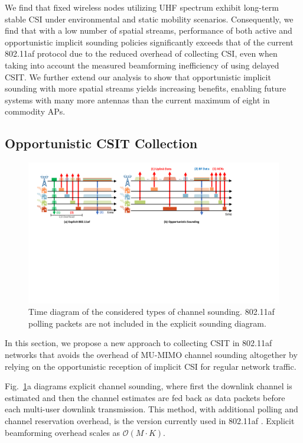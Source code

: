 We find that fixed wireless nodes utilizing UHF spectrum exhibit long-term stable \ac{CSI} under environmental and static mobility scenarios.
Consequently, we find that with a low number of spatial streams, performance of both active and opportunistic implicit sounding policies significantly exceeds that of the current 802.11af protocol due to the reduced overhead of collecting \ac{CSI}, even when taking into account the measured beamforming inefficiency of using delayed \ac{CSIT}.
We further extend our analysis to show that opportunistic implicit sounding with more spatial streams yields increasing benefits, enabling future systems with many more antennas than the current maximum of eight in commodity \acp{AP}.
	
\subsection{Opportunistic \ac{CSIT} Collection}
\label{sec:wurcProtocol}

\begin{figure}[t] %
\centering
\includegraphics[width=1\textwidth]{figs/protocol/opportunistic_diagram.pdf}
\caption{Time diagram of the considered types of channel sounding. 802.11af polling packets are not included in the explicit sounding diagram.}
\label{fig:soundingDiagrams}
\end{figure}

In this section, we propose a new approach to collecting \ac{CSIT} in 802.11af networks that avoids the overhead of \ac{MU-MIMO} channel sounding altogether by relying on the opportunistic reception of implicit \ac{CSI} for regular network traffic.

 Fig.~\ref{fig:soundingDiagrams}a diagrams explicit channel sounding, where first the downlink channel is estimated and then the channel estimates are fed back as data packets before each multi-user downlink transmission.
 This method, with additional polling and channel reservation overhead, is the version currently used in 802.11af \cite{std11af}.
 Explicit beamforming overhead scales as $\mathcal{O}(M\cdot K)$.

